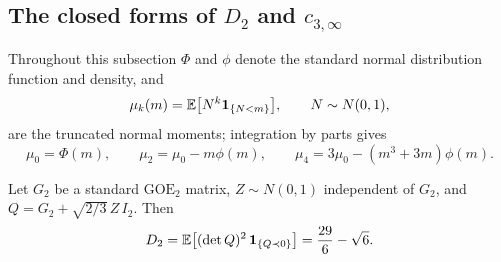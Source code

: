 \subsection{The closed forms of \texorpdfstring{$D_2$}{D2} and \texorpdfstring{$c_{3,\infty}$}{c3,infinity}}\label{ssec:coefficient-D2}

Throughout this subsection $\Phi$ and $\phi$ denote the standard normal distribution function and density, and
\begin{equation}\label{eq:coefficient-mu}
\mu_k(m)=\mathbb E\bigl[N^k\mathbf 1_{\{N<m\}}\bigr],\qquad N\sim N(0,1),
\end{equation}
are the truncated normal moments; integration by parts gives
\begin{equation}\label{eq:coefficient-mu-values}
\mu_0=\Phi(m),\qquad \mu_2=\mu_0-m\phi(m),\qquad \mu_4=3\mu_0-(m^3+3m)\phi(m).
\end{equation}

\begin{theorem}\label{thm:coefficient-D2}
Let $G_2$ be a standard $\mathrm{GOE}_2$ matrix, $Z\sim N(0,1)$ independent of $G_2$, and $Q=G_2+\sqrt{2/3}\,Z\,I_2$. Then
\begin{equation}\label{eq:coefficient-D2}
D_2=\mathbb E\bigl[(\det Q)^2\,\mathbf 1_{\{Q\prec0\}}\bigr]=\frac{29}{6}-\sqrt6 .
\end{equation}
\end{theorem}


